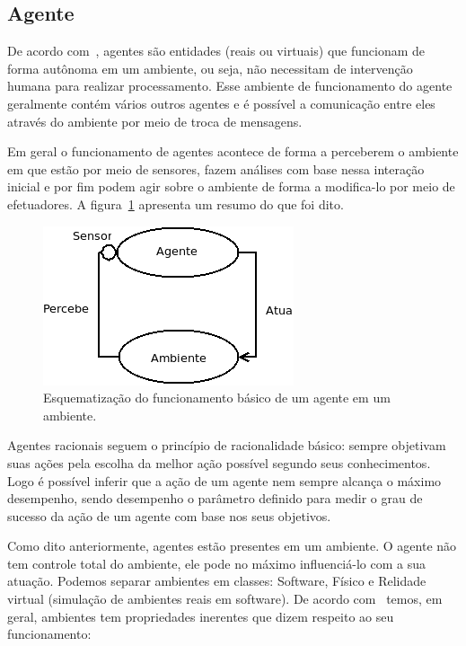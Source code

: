 \subsection{Agente}

De acordo com~\cite{novig95}, agentes são entidades (reais ou virtuais) que funcionam de forma autônoma em um ambiente, ou seja, não necessitam de intervenção humana para realizar processamento. Esse ambiente de funcionamento do agente geralmente contém vários outros agentes e é possível a comunicação entre eles através do ambiente por meio de troca de mensagens.

Em geral o funcionamento de agentes acontece de forma a perceberem o ambiente em que estão por meio de sensores, fazem análises com base nessa interação inicial e por fim podem agir sobre o ambiente de forma a modifica-lo por meio de efetuadores. A figura~\ref{fig:agente-basico} apresenta um resumo do que foi dito.

\begin{figure}
	\centering
	\includegraphics[scale=0.75]{images/agente-basico.png}
	\caption{Esquematização do funcionamento básico de um agente em um ambiente.}
	\label{fig:agente-basico}
\end{figure}

Agentes racionais seguem o princípio de racionalidade básico: sempre objetivam suas ações pela escolha da melhor ação possível segundo seus conhecimentos. Logo é possível inferir que a ação de um agente nem sempre alcança o máximo desempenho, sendo desempenho o parâmetro definido para medir o grau de sucesso da ação de um agente com base nos seus objetivos.

Como dito anteriormente, agentes estão presentes em um ambiente. O agente não tem controle total do ambiente, ele pode no máximo influenciá-lo com a sua atuação. Podemos separar ambientes em classes: Software, Físico e Relidade virtual (simulação de ambientes reais em software). De acordo com~\cite{wooldridge04} temos, em geral, ambientes tem propriedades inerentes que dizem respeito ao seu funcionamento:


